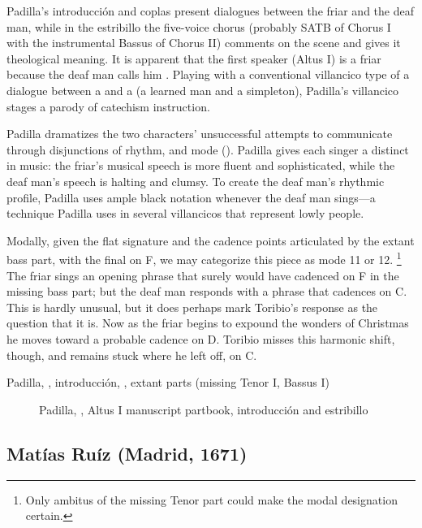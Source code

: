Padilla's introducción and coplas present dialogues between the friar and the deaf man, while in the estribillo the five-voice chorus (probably SATB of Chorus I with the instrumental Bassus of Chorus II) comments on the scene and gives it theological meaning.
It is apparent that the first speaker (Altus I) is a friar because the deaf man calls him .
Playing with a conventional villancico type of a dialogue between a  and a  (a learned man and a simpleton), Padilla's villancico stages a parody of catechism instruction.


Padilla dramatizes the two characters' unsuccessful attempts to communicate through disjunctions of rhythm, and mode ().
Padilla gives each singer a distinct  in music: the friar's musical speech is more fluent and sophisticated, while the deaf man's speech is halting and clumsy.
To create the deaf man's rhythmic profile, Padilla uses ample black notation whenever the deaf man sings---a technique Padilla uses in several villancicos that represent lowly people.%

Modally, given the flat  signature and the cadence points articulated by the extant bass part, with the final on F, we may categorize this piece as mode 11 or 12.%
  \footnote{Only ambitus of the missing Tenor part could make the modal designation certain.}
The friar sings an opening phrase that surely would have cadenced on F in the missing bass part; but the deaf man responds with a phrase that cadences on C.
This is hardly unusual, but it does perhaps mark Toribio's response as the question that it is.
Now as the friar begins to expound the wonders of Christmas he moves toward a probable cadence on D.
Toribio misses this harmonic shift, though, and remains stuck where he left off, on C.




\begin{exmusic}
\caption{Padilla, , introducción, , extant parts (missing Tenor I, Bassus I)}
\label{exmusic:Padilla-Sordo-intro}
\end{exmusic}


\begin{figure}
\caption{Padilla, , Altus I manuscript partbook, introducción and estribillo}
\label{figure:Padilla-Sordo-MS-estribillo}
\end{figure}

\subsection{Matías Ruíz (Madrid, 1671)}


